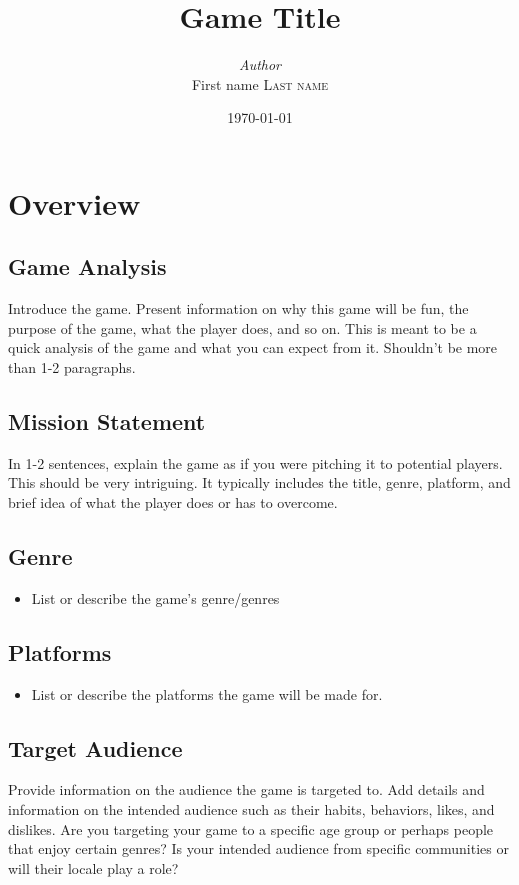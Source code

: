 \documentclass[a4paper, 12pt]{report}
\title{Game Title}
\author{\textit{Author}\\First name \textsc{Last name}}
\date{\today}
\begin{document}
    \maketitle
    
    \tableofcontents

\chapter{Overview}

\section{Game Analysis}
Introduce the game. Present information on why this game will be fun, the purpose of the game, what the player does, and so on. This is meant to be a quick analysis of the game and what you can expect from it. Shouldn’t be more than 1-2 paragraphs.

\section{Mission Statement}
In 1-2 sentences, explain the game as if you were pitching it to potential players. This should be very intriguing. It typically includes the title, genre, platform, and brief idea of what the player does or has to overcome.


\section{Genre}
\begin{itemize}
    \item List or describe the game’s genre/genres
\end{itemize}
    

\section{Platforms}
\begin{itemize}
    \item List or describe the platforms the game will be made for.
\end{itemize}

    

\section{Target Audience}
Provide information on the audience the game is targeted to. Add details and information on the intended audience such as their habits, behaviors, likes, and dislikes. Are you targeting your game to a specific age group or perhaps people that enjoy certain genres? Is your intended audience from specific communities or will their locale play a role?
\end{document}
